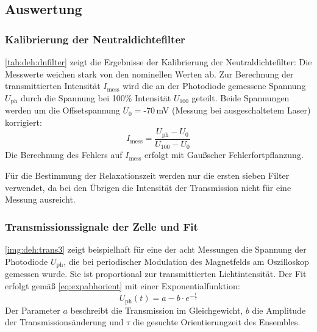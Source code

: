 \subsection{Auswertung}

\subsubsection*{Kalibrierung der Neutraldichtefilter}

\autoref{tab:deh:dnfilter} zeigt die Ergebnisse der Kalibrierung der Neutraldichtefilter:
Die Messwerte weichen stark von den nominellen Werten ab.
Zur Berechnung der transmittierten Intensität $I_\text{mess}$ wird
die an der Photodiode gemessene Spannung $U_{\text{ph}}$
durch die Spannung bei 100\% Intensität $U_{100}$ geteilt.
Beide Spannungen werden um die Offsetspannung $U_{0}=\text{-}70\,$mV (Messung bei ausgeschaltetem Laser) korrigiert:
\begin{equation}
  I_\text{mess}=\frac{U_{\text{ph}}-U_{0}}{U_{100}-U_{0}}
\end{equation}
Die Berechnung des Fehlers auf $I_\text{mess}$ erfolgt mit Gaußscher Fehlerfortpflanzung.


Für die Bestimmung der Relaxationszeit werden nur die ersten sieben Filter verwendet,
da bei den Übrigen die Intensität der Transmission nicht für eine Messung ausreicht.\\



\subsubsection*{Transmissionssignale der Zelle und Fit}
\autoref{img:deh:trans3} zeigt beispielhaft für eine der acht Messungen
die Spannung der Photodiode $U_{\text{ph}}$,
die bei periodischer Modulation des Magnetfelds am Oszilloskop gemessen wurde.
Sie ist proportional zur transmittierten Lichtintensität.
Der Fit erfolgt gemäß \autoref{eq:expabhorient} mit einer Exponentialfunktion:
\begin{equation}
  U_{\text{ph}}(t)=a - b \cdot e^{-\frac{t}{\tau}}
\end{equation}
Der Parameter $a$ beschreibt die Transmission im Gleichgewicht, $b$ die Amplitude der
Transmissionsänderung und $\tau$ die gesuchte Orientierungzeit des Ensembles.

